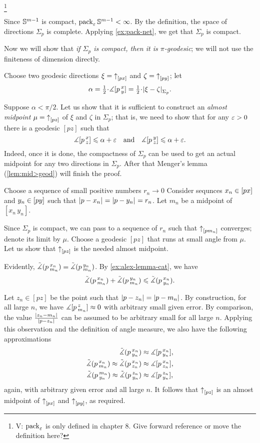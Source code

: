 \footnote{\red V: $\operatorname{\rm pack}\nolimits_\varepsilon$ is only defined in chapter 8. Give forward reference or move the definition here? }

Since $\mathbb{S}^{m-1}$ is compact, $\operatorname{\rm pack}\nolimits_\varepsilon\mathbb{S}^{m-1}<\infty$.
By the definition, the space of directions $\Sigma_p$ is complete. 
Applying \ref{ex:pack-net}, we get that  $\Sigma_p$ is compact.

Now we will show that \textit{if $\Sigma_p$ is compact, then it is $\pi$-geodesic};
we will not use the finiteness of dimension directly.

Choose two geodesic directions $\xi={\uparrow}_{[{p}{x}]}$ and $\zeta={\uparrow}_{[{p}{y}]}$;
let 
\[\alpha\z=\tfrac12\cdot \mangle \hinge pxy=\tfrac12\cdot \dist{\xi}{\zeta}{\Sigma_p}.\]

Suppose $\alpha<\pi/2$.
Let us show that it is sufficient to construct an \emph{almost midpoint} $\mu\z=\dir pz$ of $\xi$ and $\zeta$ in $\Sigma_p$;
that is, we need to show that for any $\varepsilon>0$ there is a geodesic $[pz]$ such that
\[\measuredangle[p\,{}^{x}_{z}]\leqslant \alpha+\varepsilon
\quad\text{and}\quad
\measuredangle[p\,{}^{y}_{z}]\leqslant \alpha+\varepsilon.\]
Indeed, once it is done, the compactness of $\Sigma_p$ can be used to get an actual midpoint for any two directions in $\Sigma_p$.
After that Menger's lemma (\ref{lem:mid>geod}) will finish the proof.

Choose a sequence of small positive numbers $r_n\to0$
Consider sequnces $x_n\z\in [px]$ and $y_n\z\in [py]$ such that $\dist{p}{x_n}{}=\dist{p}{y_n}{}=r_n$.
Let $m_n$ be a midpoint of $[x_n\,y_n]$.

Since $\Sigma_p$ is compact, we can pass to a sequence of $r_n$ such that 
${\uparrow}_{[{p}{m_n}]}$ converges;
denote its limit by $\mu$.
Choose a geodesic $[pz]$ that runs at small angle from $\mu$.
Let us show that ${\uparrow}_{[{p}{z}]}$ is the needed almost midpoint.

Evidently, $\tilde\measuredangle(p\,{}^{x_n}_{m_n})=\tilde\measuredangle(p\,{}^{y_n}_{m_n})$.
By \ref{ex:alex-lemma-cat}, we have
\[\tilde\measuredangle(p\,{}^{x_n}_{m_n})+\tilde\measuredangle(p\,{}^{y_n}_{m_n})\leqslant \tilde\measuredangle(p\,{}^{x_n}_{y_n}).\]

Let $z_n\in [pz]$ be the point such that $\dist{p}{z_n}{}=\dist{p}{m_n}{}$.
By construction, for all large $n$, we have $\measuredangle[p\,{}^{z}_{m_n}]\approx0$  with arbitrary small given error.
By comparison, the value $\frac{\dist{z_n}{m_n}{}}{\dist{p}{z_n}{}}$ can be assumed to be arbitrary small for all large $n$.
Applying this observation and the definition of angle measure, we also have the following approximations
\begin{align*}
\tilde\measuredangle(p\,{}^{x_n}_{y_n})&\approx \measuredangle[p\,{}^{x_n}_{y_n}],
\\
\tilde\measuredangle(p\,{}^{x_n}_{m_n})\approx\tilde\measuredangle(p\,{}^{x_n}_{z_n})&\approx\measuredangle[p\,{}^{x_n}_{z_n}],
\\
\tilde\measuredangle(p\,{}^{m_n}_{y_n})\approx\tilde\measuredangle(p\,{}^{z_n}_{y_n})&\approx\measuredangle[p\,{}^{z_n}_{y_n}],
\end{align*}
again, with arbitrary given error and all large $n$.
It follows that ${\uparrow}_{[{p}{z}]}$ is an almost midpoint of ${\uparrow}_{[{p}{x}]}$ and ${\uparrow}_{[{p}{y}]}$, as required.
\qeds

